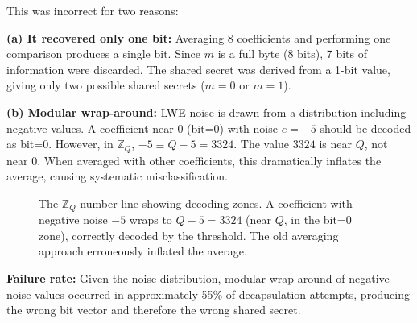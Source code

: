 \documentclass[12pt,a4paper]{report}
\begin{document}
This was incorrect for two reasons:

\textbf{(a) It recovered only one bit:} Averaging 8 coefficients and performing one
comparison produces a single bit. Since $m$ is a full byte (8 bits), 7 bits of
information were discarded. The shared secret was derived from a 1-bit value, giving
only two possible shared secrets ($m = 0$ or $m = 1$).

\textbf{(b) Modular wrap-around:} LWE noise is drawn from a distribution including
negative values. A coefficient near $0$ (bit=0) with noise $e = -5$ should be decoded
as bit=0. However, in $\mathbb{Z}_Q$, $-5 \equiv Q - 5 = 3324$. The value $3324$ is
near $Q$, not near $0$. When averaged with other coefficients, this dramatically
inflates the average, causing systematic misclassification.

\begin{figure}[H]
\centering
{}
\caption{The $\mathbb{Z}_Q$ number line showing decoding zones. A coefficient with
negative noise $-5$ wraps to $Q-5 = 3324$ (near $Q$, in the bit=0 zone), correctly
decoded by the threshold. The old averaging approach erroneously inflated the average.}
\label{fig:threshold}
\end{figure}

\textbf{Failure rate:} Given the noise distribution, modular wrap-around of negative
noise values occurred in approximately 55\% of decapsulation attempts, producing the
wrong bit vector and therefore the wrong shared secret.
\end{document}
